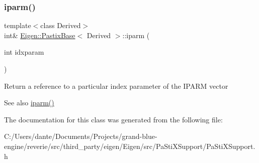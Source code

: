 \subsubsection{\texorpdfstring{iparm()}{iparm()}\hspace{0.1cm}{\footnotesize\ttfamily [2/2]}}
{\footnotesize\ttfamily template$<$class Derived$>$ \\
int\& \mbox{\hyperlink{class_eigen_1_1_pastix_base}{Eigen\+::\+Pastix\+Base}}$<$ Derived $>$\+::iparm (\begin{DoxyParamCaption}\item[{int}]{idxparam }\end{DoxyParamCaption})\hspace{0.3cm}{\ttfamily [inline]}}

Return a reference to a particular index parameter of the I\+P\+A\+RM vector \begin{DoxySeeAlso}{See also}
\mbox{\hyperlink{class_eigen_1_1_pastix_base_a38378e7b2b5c750a8a23e2c21a69146c}{iparm()}} 
\end{DoxySeeAlso}


The documentation for this class was generated from the following file\+:\begin{DoxyCompactItemize}
\item 
C\+:/\+Users/dante/\+Documents/\+Projects/grand-\/blue-\/engine/reverie/src/third\+\_\+party/eigen/\+Eigen/src/\+Pa\+Sti\+X\+Support/Pa\+Sti\+X\+Support.\+h\end{DoxyCompactItemize}
